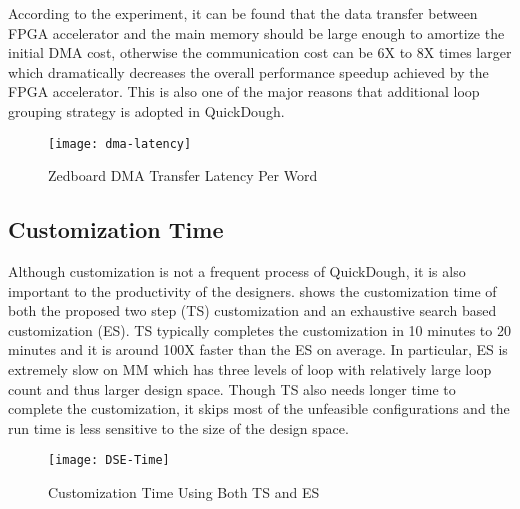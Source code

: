 According to the experiment, it can be found that the data transfer between FPGA accelerator and the main memory should be large enough to amortize the initial DMA cost, otherwise the communication cost can be 6X to 8X times larger which dramatically decreases the overall performance speedup achieved by the FPGA accelerator. This is also one of the major reasons that additional loop grouping strategy is adopted in QuickDough. 

\begin{figure}[htb]
    \centering
    \texttt{[image: dma-latency]}
    \caption{Zedboard DMA Transfer Latency Per Word}
    \label{fig:dma-latency}
\end{figure}

\subsection{Customization Time}
Although customization is not a frequent process of QuickDough, it is also important to the productivity of the designers.  shows the customization time of both the proposed two step (TS) customization and an exhaustive search based customization (ES). TS typically completes the customization in 10 minutes to 20 minutes and it is around 100X faster than the ES on average. In particular, ES is extremely slow on MM which has three levels of loop with relatively large loop count and thus larger design space. Though TS also needs longer time to complete the customization, it skips most of the unfeasible configurations and the run time is less sensitive to the size of the design space. 

\begin{figure}[htb]
    \centering
    \texttt{[image: DSE-Time]}
    \caption{Customization Time Using Both TS and ES}
    \label{fig:DSE-Time}
\end{figure}



